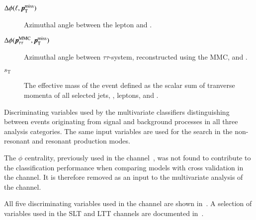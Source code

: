 \begin{description}
\item[$\Delta\phi(\ell, \pTmiss)$] Azimuthal angle between the lepton
  and \pTmiss.

\item[$\Delta\phi(\pTauTau, \pTmiss)$] Azimuthal angle between
  $\tau\tau$-system, reconstructed using the MMC, and \pTmiss.

\item[$s_{\text{T}}$] The effective mass of the event defined as the
  scalar sum of tranverse momenta of all selected jets, \tauhadvis,
  leptons, and \pTmissAbs.
\end{description}

\begin{table}[htbp]
  \centering

  

  \caption{Discriminating variables used by the multivariate
    classifiers distinguishing between events originating from signal
    and background processes in all three analysis categories. The
    same input variables are used for the search in the non-resonant
    and resonant production modes.}
  \label{tab:mva_inputvar}
\end{table}

The \pTmiss $\phi$ centrality, previously used in the \hadhad
channel~\cite{HIGG-2016-16-witherratum}, was not found to contribute
to the classification performance when comparing models with cross
validation in the \hadhad channel. It is therefore removed as an input
to the multivariate analysis of the \hadhad channel.

All five discriminating variables used in the \hadhad channel are
shown in~. A selection of variables used in the
\lephad SLT and LTT channels are documented
in~\cite{ATLAS-CONF-2021-030}.



